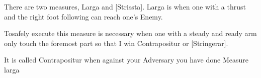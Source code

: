 \newpage


\newpage


 There are two measures, Larga and [Strissta]. Larga is when one with
 a thrust and the right foot following can reach one's Enemy.

Tosafely execute this measure is necessary when one with a steady and
ready arm only touch the foremost part so that I win Contrapositur or
[Stringerar].

It is called Contrapositur when against your Adversary you have done
Measure larga